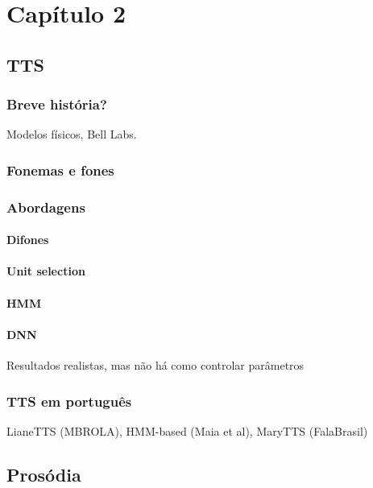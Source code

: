 
\chapter{Capítulo 2}


\section{TTS}
\subsection{Breve história?}
Modelos físicos, Bell Labs.
\subsection{Fonemas e fones}
\subsection{Abordagens}
\subsubsection{Difones}
\subsubsection{Unit selection}
\subsubsection{HMM}
\subsubsection{DNN}
Resultados realistas, mas não há como controlar parâmetros
\subsection{TTS em português}
LianeTTS (MBROLA), HMM-based (Maia et al), MaryTTS (FalaBrasil)
\section{Prosódia}
